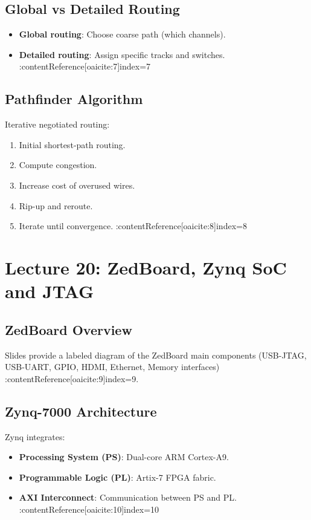 \documentclass[11pt]{article}
\begin{document}
\subsection{Global vs Detailed Routing}
\begin{itemize}
    \item \textbf{Global routing}: Choose coarse path (which channels).
    \item \textbf{Detailed routing}: Assign specific tracks and switches. :contentReference[oaicite:7]{index=7}
\end{itemize}

\subsection{Pathfinder Algorithm}
Iterative negotiated routing:
\begin{enumerate}
    \item Initial shortest‐path routing.
    \item Compute congestion.
    \item Increase cost of overused wires.
    \item Rip-up and reroute.
    \item Iterate until convergence. :contentReference[oaicite:8]{index=8}
\end{enumerate}

\newpage

\section{Lecture 20: ZedBoard, Zynq SoC and JTAG}

\subsection{ZedBoard Overview}
Slides provide a labeled diagram of the ZedBoard main components
(USB-JTAG, USB-UART, GPIO, HDMI, Ethernet, Memory interfaces)
:contentReference[oaicite:9]{index=9}.

\subsection{Zynq-7000 Architecture}
Zynq integrates:
\begin{itemize}
    \item \textbf{Processing System (PS)}: Dual-core ARM Cortex-A9.
    \item \textbf{Programmable Logic (PL)}: Artix-7 FPGA fabric.
    \item \textbf{AXI Interconnect}: Communication between PS and PL. :contentReference[oaicite:10]{index=10}
\end{itemize}
\end{document}
